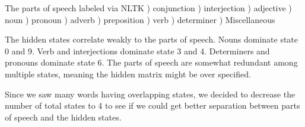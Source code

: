 \begin{figure}[H]
\end{figure}

The parts of speech labeled via NLTK ) conjunction ) interjection ) adjective ) noun ) pronoun ) adverb ) preposition ) verb ) determiner ) Miscellaneous 

 The hidden states correlate weakly to the parts of speech. Nouns dominate state 0 and 9. Verb and interjections dominate state 3 and 4. Determiners and pronouns dominate state 6. The parts of speech are somewhat redundant among multiple states, meaning the hidden matrix might be over specified. 
 
Since we saw many words having overlapping states, we decided to decrease the number of total states to 4 to see if we could get better separation between parts of speech and the hidden states.

